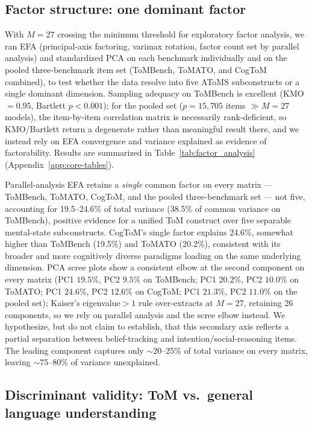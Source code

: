 \documentclass{article} %
\begin{document}
\subsection{Factor structure: one dominant factor}
\label{sec:disc-pca}
 
With $M=27$ crossing the minimum threshold for exploratory factor
analysis, we ran EFA (principal-axis factoring, varimax rotation, factor
count set by parallel analysis) and standardized PCA on each benchmark
individually and on the pooled three-benchmark item set (ToMBench, ToMATO,
and CogToM combined), to test whether the data resolve into five AToMS
subconstructs or a single dominant dimension. Sampling adequacy on ToMBench
is excellent (KMO$=0.95$, Bartlett $p<0.001$); for the pooled set ($p=15{,}705$
items $\gg M=27$ models), the item-by-item correlation matrix is necessarily
rank-deficient, so KMO/Bartlett return a degenerate rather than meaningful
result there, and we instead rely on EFA convergence and variance explained
as evidence of factorability. Results are
summarized in Table~\ref{tab:factor_analysis} (Appendix~\ref{app:core-tables}).
 
Parallel-analysis EFA retains a \emph{single} common factor on every
matrix --- ToMBench, ToMATO, CogToM, and the pooled three-benchmark set --- not
five, accounting for 19.5--24.6\% of total variance (38.5\% of common
variance on ToMBench), positive evidence for a unified ToM construct over
five separable mental-state subconstructs. CogToM's single factor explains
24.6\%, somewhat higher than ToMBench (19.5\%) and ToMATO (20.2\%), consistent
with its broader and more cognitively diverse paradigms loading on the same
underlying dimension. PCA scree plots show a consistent elbow at the second
component on every matrix (PC1 $19.5\%$, PC2 $9.5\%$ on ToMBench; PC1
$20.2\%$, PC2 $10.0\%$ on ToMATO; PC1 $24.6\%$, PC2 $12.6\%$ on CogToM; PC1
$21.3\%$, PC2 $11.0\%$ on the pooled set); Kaiser's eigenvalue${>}1$ rule
over-extracts at $M=27$, retaining 26 components, so we rely on parallel
analysis and the scree elbow instead. We hypothesize, but do not claim to
establish, that this secondary axis reflects a partial separation between
belief-tracking and intention/social-reasoning items. The leading component
captures only $\sim$20--25\% of total variance on every matrix, leaving
$\sim$75--80\% of variance unexplained. 
 
\subsection{Discriminant validity: ToM vs.\ general language understanding}
\label{sec:disc-discriminant}
 
\end{document}
